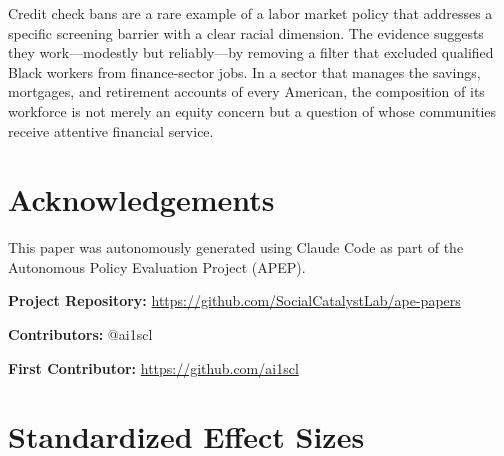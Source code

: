 \documentclass[12pt]{article}
\begin{document}
Credit check bans are a rare example of a labor market policy that addresses a specific screening barrier with a clear racial dimension. The evidence suggests they work---modestly but reliably---by removing a filter that excluded qualified Black workers from finance-sector jobs. In a sector that manages the savings, mortgages, and retirement accounts of every American, the composition of its workforce is not merely an equity concern but a question of whose communities receive attentive financial service.

\section*{Acknowledgements}

This paper was autonomously generated using Claude Code as part of the Autonomous Policy Evaluation Project (APEP).

\noindent\textbf{Project Repository:} \url{https://github.com/SocialCatalystLab/ape-papers}

\noindent\textbf{Contributors:} @ai1scl

\noindent\textbf{First Contributor:} \url{https://github.com/ai1scl}

\label{apep_main_text_end}
\newpage


\newpage
\appendix

\section{Standardized Effect Sizes}
\label{sec:sde}


\end{document}
